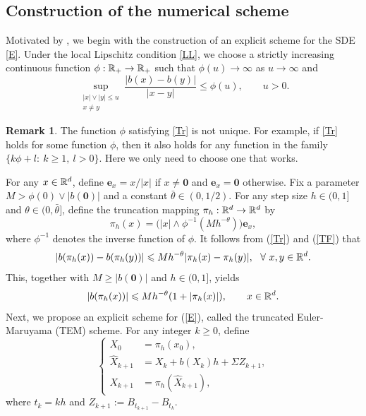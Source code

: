\documentclass[aap]{imsart}
\theoremstyle{plain}
\theoremstyle{definition}
\newtheorem{remark}{Remark}
\begin{document}
\subsection{Construction of the numerical scheme}
Motivated by \cite{IMA}, we begin with the construction of an explicit scheme for the SDE \eqref{E}. Under the local Lipschitz condition \eqref{LL}, we choose a strictly increasing continuous function
\(\phi:\mathbb{R}_+\to\mathbb{R}_+\) such that \(\phi(u)\to\infty\) as \(u\to\infty\) and
\begin{equation}\label{Tr}
	\sup_{\substack{|x|\vee |y|\leqslant u\\ x\neq y}}
	\frac{|b(x)-b(y)|}{|x-y|}
	\leqslant \phi(u),
	\qquad u>0.
\end{equation}
\begin{remark}
The function \(\phi\) satisfying \eqref{Tr} is not unique. For example, if \eqref{Tr} holds for some function \(\phi\), then it also holds for any function in the family \(\{k\phi+l:\ k\geqslant1,\ l>0\}\).
Here we only need to choose one that works.
\end{remark}
For any $x\in\mathbb{R}^d$, define $\boldsymbol{e}_{x} = x/|x|$ if $x\neq \boldsymbol{0}$ and \(\boldsymbol{e}_{x} = \boldsymbol{0}\) otherwise.
Fix a parameter $M> \phi(0)\vee|b(\mathbf{0})|$ and a constant $\bar{\theta}\in(0, 1/2)$. For any step size $h\in(0,1]$ and $\theta\in(0, \bar{\theta}]$, define the truncation mapping $\pi_h:\mathbb{R}^d \rightarrow\mathbb{R}^d$ by
\begin{equation}\label{TF}
\pi_h(x) =  \Big(|x| \wedge \phi^{-1}(Mh^{-\theta})\Big) \boldsymbol{e}_{x} ,
\end{equation}
where $\phi^{-1}$ denotes the inverse function of $\phi$. 
It follows from (\ref{Tr}) and (\ref{TF}) that  
\begin{equation}\label{GL}
|b(\pi_h(x))-b(\pi_h(y))|\leqslant Mh^{-\theta}|\pi_h(x)-\pi_h(y)|,~~\forall~ x, y\in\mathbb{R}^d.
\end{equation}
This, together with \(M\geqslant |b(\mathbf{0})|\) and \(h\in(0,1]\), yields
\[
|b(\pi_h(x))|
\leqslant Mh^{-\theta}(1+|\pi_h(x)|),
\qquad x\in\mathbb{R}^d.
\]
Next, we propose an explicit scheme for (\ref{E}),  called the truncated Euler-Maruyama (TEM) scheme. For any integer $k\geqslant 0$, define
\begin{equation}\label{TEM}
\left\{
\begin{aligned}
X_0 &= \pi_h(x_0),\\
\hat{X}_{k+1} &= X_k + b(X_k)h + \Sigma Z_{k+1}, \\
X_{k+1} &= \pi_h(\hat{X}_{k+1}), 
\end{aligned}\right.
\end{equation}
where $t_k=kh$ and $Z_{k+1} := B_{t_{k+1}}-B_{t_{k}}$. 
\end{document}
